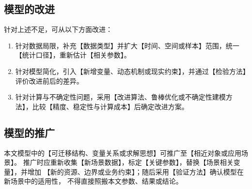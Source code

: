 \subsection{模型的改进}

针对上述不足，可从以下方面改进：

\begin{enumerate}
  \item 针对数据局限，补充【数据类型】并扩大【时间、空间或样本】范围，统一【统计口径】，重新估计【相关参数】。
  \item 针对模型简化，引入【新增变量、动态机制或现实约束】，并通过【检验方法】评价改进前后的差异。
  \item 针对计算与不确定性问题，采用【改进算法、鲁棒优化或不确定性建模方法】，比较【精度、稳定性与计算成本】后确定改进方案。
\end{enumerate}

\subsection{模型的推广}

本文模型中的【可迁移结构、变量关系或求解思想】可推广至【相近对象或应用场景】。
推广时应重新收集【新场景数据】，标定【关键参数】，替换【场景相关变量】，并增加
【新的资源、边界或业务约束】；随后采用【验证方法】确认模型在新场景中的适用性，
不得直接照搬本文参数、结果或结论。
